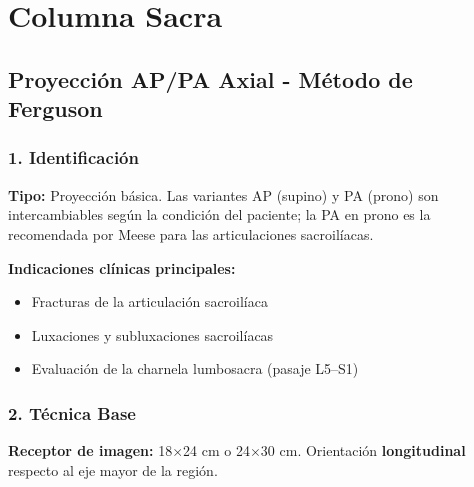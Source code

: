 		
		\twocolumn
		\clearpage
		
		
		
		\section{Columna Sacra}
		
		\subsection{Proyección AP/PA Axial - Método de Ferguson}
		
		\subsubsection*{1. Identificación}
		
		\textbf{Tipo:} Proyección básica. Las variantes AP (supino) y PA (prono) son intercambiables según la condición del paciente; la PA en prono es la recomendada por Meese para las articulaciones sacroilíacas.
		
		\textbf{Indicaciones clínicas principales:}
		\begin{itemize}
			\item Fracturas de la articulación sacroilíaca
			\item Luxaciones y subluxaciones sacroilíacas
			\item Evaluación de la charnela lumbosacra (pasaje L5--S1)
		\end{itemize}
		
		\subsubsection*{2. Técnica Base}
		
		\textbf{Receptor de imagen:} 18$\times$24 cm o 24$\times$30 cm. Orientación \textbf{longitudinal} respecto al eje mayor de la región.
		
